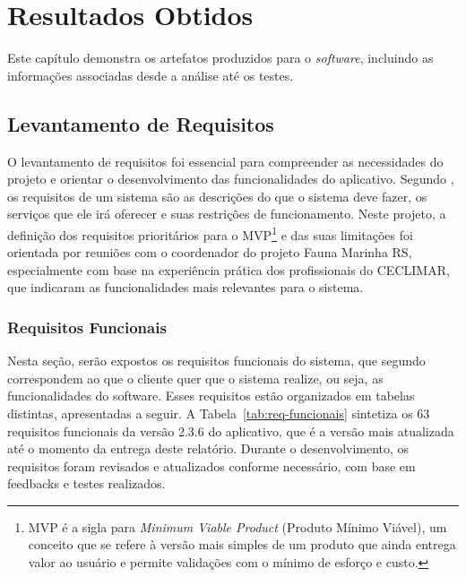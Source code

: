 \chapter{Resultados Obtidos}
Este capítulo demonstra os artefatos produzidos para o \textit{software}, incluindo 
as informações associadas desde a análise até os testes.

\section{Levantamento de Requisitos}

O levantamento de requisitos foi essencial para compreender as necessidades do projeto e orientar o 
desenvolvimento das funcionalidades do aplicativo. Segundo 
, os requisitos de um sistema são as descrições do que o sistema deve 
fazer, os serviços que ele irá oferecer e suas restrições de funcionamento. Neste projeto, a 
definição dos requisitos prioritários para o MVP\footnote{MVP é a sigla para 
\textit{Minimum Viable Product} (Produto Mínimo Viável), um conceito que se refere à 
versão mais simples de um produto 
que ainda entrega valor ao usuário e permite validações com o mínimo de esforço e 
custo.} e das suas limitações foi orientada por reuniões 
com o coordenador do projeto Fauna Marinha RS, especialmente com base na experiência prática dos 
profissionais do CECLIMAR, que indicaram as funcionalidades mais relevantes para o sistema.

\subsection{Requisitos Funcionais}

Nesta seção, serão expostos os requisitos funcionais do sistema, que segundo 
 correspondem ao que o cliente quer que o sistema realize,
ou seja, as funcionalidades do software. Esses requisitos estão organizados em tabelas
distintas, apresentadas a seguir. A Tabela~\ref{tab:req-funcionais} sintetiza os 63 requisitos funcionais
da versão 2.3.6 do aplicativo, que é a versão mais atualizada até o momento da entrega deste relatório.
Durante o desenvolvimento, os requisitos foram revisados e atualizados conforme necessário,
com base em feedbacks e testes realizados.

